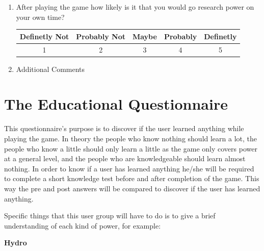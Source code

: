 \documentclass[msc,oneside]{ubcthesis}%
\begin{document}
\begin{enumerate}
      \item  After playing the game how likely is it that you would go research power on your own time?
      \begin{table}[tbph]
        \centering        
        \label{table:research}
        \begin{tabular}{|c|c|c|c|c|}
        \hline
        Definetly Not & Probably Not & Maybe & Probably & Definetly \\ \hline
        1 & 2 & 3 & 4 & 5 \\ \hline
        \end{tabular}
      \end{table}

      \item Additional Comments

    \end{enumerate}

\section{The Educational Questionnaire}
    This questionnaire's purpose is to discover if the user learned anything while playing the game. In theory the people who know nothing should learn a lot, the people who know a little should only learn a little as the game only covers power at a general level, and the people who are knowledgeable should learn almost nothing. In order to know if a user has learned anything he/she will be required to complete a short knowledge test before and after completion of the game. This way the pre and post answers will be compared to discover if the user has learned anything.

Specific things that this user group will have to do is to give a brief understanding of each kind of power, for example:

\indent \textbf{Hydro}
\end{document}
